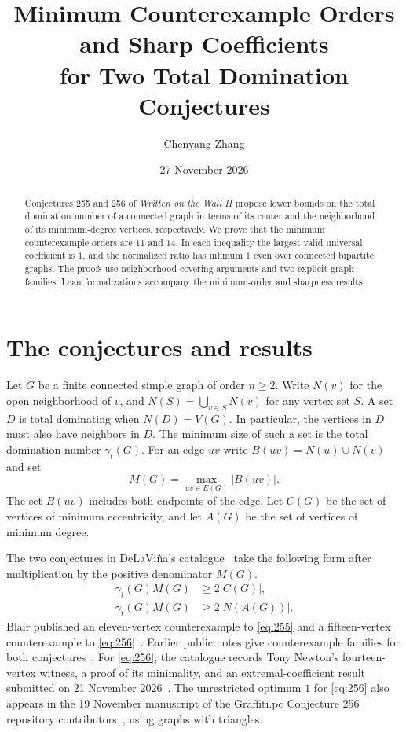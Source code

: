 \documentclass[11pt]{article}
\title{Minimum Counterexample Orders and Sharp Coefficients\\
       for Two Total Domination Conjectures}
\author{Chenyang Zhang}
\date{27 November 2026}
\newcommand{\gt}{\gamma_t}
\begin{document}
\maketitle

\begin{abstract}
Conjectures 255 and 256 of \emph{Written on the Wall II} propose
lower bounds on the total domination number of a connected graph in
terms of its center and the neighborhood of its minimum-degree vertices,
respectively. We prove that the minimum counterexample orders are
\(11\) and \(14\). In each inequality the largest valid universal
coefficient is \(1\), and the normalized ratio has infimum \(1\)
even over connected bipartite graphs. The proofs use neighborhood
covering arguments and two explicit graph families. Lean
formalizations accompany the minimum-order and sharpness results.
\end{abstract}

\section{The conjectures and results}

Let \(G\) be a finite connected simple graph of order \(n\ge 2\).
Write \(N(v)\) for the open neighborhood of \(v\), and
\(N(S)=\bigcup_{v\in S}N(v)\) for any vertex set \(S\).
A set \(D\) is total dominating when \(N(D)=V(G)\). In particular,
the vertices in \(D\) must also have neighbors in \(D\).
The minimum size of such a set is the total domination number
\(\gt(G)\). For an edge \(uv\) write \(B(uv)=N(u)\cup N(v)\) and set
\[
 M(G)=\max_{uv\in E(G)}|B(uv)|.
\]
The set \(B(uv)\) includes both endpoints of the edge. Let \(C(G)\)
be the set of vertices of minimum eccentricity, and let \(A(G)\)
be the set of vertices of minimum degree.

The two conjectures in DeLaVi\~na's catalogue~\cite{wowii} take the
following form after multiplication by the positive denominator \(M(G)\).
\begin{align}
 \gt(G)M(G)&\ge 2|C(G)|,   \tag{255}\label{eq:255}\\
 \gt(G)M(G)&\ge 2|N(A(G))|. \tag{256}\label{eq:256}
\end{align}
Blair published an eleven-vertex counterexample to
\eqref{eq:255} and a fifteen-vertex counterexample to
\eqref{eq:256}~\cite{blair255,blair256}. Earlier public notes
give counterexample families for both conjectures~\cite{priorfamilies}.
For \eqref{eq:256}, the catalogue records Tony Newton's fourteen-vertex
witness, a proof of its minimality, and an extremal-coefficient result
submitted on 21 November 2026~\cite{newton256}. The unrestricted
optimum \(1\) for \eqref{eq:256} also appears in the 19 November
manuscript of the Graffiti.pc Conjecture 256 repository
contributors~\cite{prior256}, using graphs with triangles.
\end{document}
